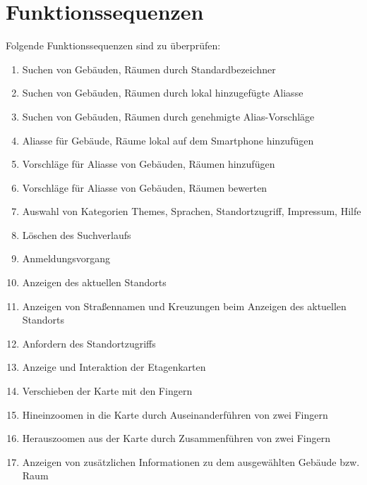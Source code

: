\section{Funktionssequenzen}

Folgende Funktionssequenzen sind zu überprüfen:
\begin{enumerate}[label=\textbf{/T\arabic*0/}, align=left]
	\item Suchen von Gebäuden, Räumen durch Standardbezeichner
	\item Suchen von Gebäuden, Räumen durch lokal hinzugefügte Aliasse
	\item Suchen von Gebäuden, Räumen durch genehmigte Alias-Vorschläge
	\item Aliasse für Gebäude, Räume lokal auf dem Smartphone hinzufügen
	\item Vorschläge für Aliasse von Gebäuden, Räumen hinzufügen
	\item Vorschläge für Aliasse von Gebäuden, Räumen bewerten
	\item Auswahl von Kategorien Themes, Sprachen, Standortzugriff, Impressum, Hilfe
	\item Löschen des Suchverlaufs
	\item Anmeldungsvorgang
	\item Anzeigen des aktuellen Standorts
	\item Anzeigen von Straßennamen und Kreuzungen beim Anzeigen des aktuellen Standorts
	\item Anfordern des Standortzugriffs
	\item Anzeige und Interaktion der Etagenkarten
	\item Verschieben der Karte mit den Fingern
	\item Hineinzoomen in die Karte durch Auseinanderführen von zwei Fingern
	\item Herauszoomen aus der Karte durch Zusammenführen von zwei Fingern
	\item Anzeigen von zusätzlichen Informationen zu dem ausgewählten Gebäude bzw. Raum
\end{enumerate}